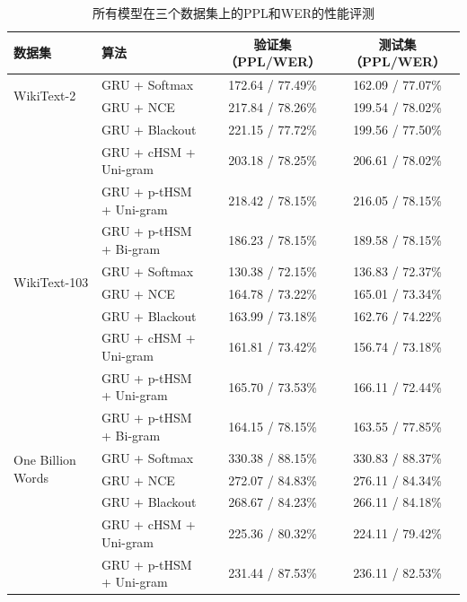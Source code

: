 \begin{table}[!t]
  \centering
  \caption{所有模型在三个数据集上的PPL和WER的性能评测\label{tab:summary_ppl}}
\begin{tabular}{llcc}
  \toprule
数据集& 算法& 验证集（PPL/WER） & 测试集（PPL/WER） \\ \midrule
 \multirow{2}{*}{WikiText-2}&GRU + Softmax&172.64 / 77.49\%&162.09 / 77.07\% \\
  &GRU + NCE~\cite{DBLP:journals/jmlr/GutmannH10}&217.84 / 78.26\%&199.54 / 78.02\%\\
  &GRU + Blackout~\cite{DBLP:journals/iclr/JiVSAD15}&221.15 / 77.72\%&199.56 / 77.50\% \\
  &GRU + cHSM + Uni-gram~\cite{DBLP:conf/acl/ChenGA16}&203.18 / 78.25\%&206.61 / 78.02\%\\
  &GRU + p-tHSM + Uni-gram~\cite{DBLP:conf/nips/MikolovSCCD13}&218.42 / 78.15\%&216.05 / 78.15\%\\
  &GRU + p-tHSM + Bi-gram~\cite{DBLP:journals/coling/BrownPdLM92}&186.23 / 78.15\%&189.58 / 78.15\%\\\midrule
   \multirow{2}{*}{WikiText-103} &GRU + Softmax&130.38 / 72.15\%&136.83 / 72.37\%\\
 &GRU + NCE~\cite{DBLP:journals/jmlr/GutmannH10}&164.78 / 73.22\%&165.01 / 73.34\%\\
  &GRU + Blackout~\cite{DBLP:journals/iclr/JiVSAD15}&163.99 / 73.18\%&162.76 / 74.22\%\\
  &GRU + cHSM + Uni-gram~\cite{DBLP:conf/acl/ChenGA16}&161.81 / 73.42\%&156.74 / 73.18\%\\
  &GRU + p-tHSM + Uni-gram~\cite{DBLP:conf/nips/MikolovSCCD13}&165.70 / 73.53\%&166.11 / 72.44\%\\
  &GRU + p-tHSM + Bi-gram~\cite{DBLP:journals/coling/BrownPdLM92}&164.15 / 78.15\%&163.55 / 77.85\%\\\midrule
  \multirow{2}{*}{One Billion Words} &GRU + Softmax&330.38 / 88.15\%&330.83 / 88.37\%\\
 & GRU + NCE~\cite{DBLP:journals/jmlr/GutmannH10}&272.07 / 84.83\%&276.11 / 84.34\%\\
  &GRU + Blackout~\cite{DBLP:journals/iclr/JiVSAD15}&268.67 / 84.23\%&266.11 / 84.18\%\\
 & GRU + cHSM + Uni-gram~\cite{DBLP:conf/acl/ChenGA16}&225.36 / 80.32\%&224.11 / 79.42\%\\
 & GRU + p-tHSM + Uni-gram~\cite{DBLP:conf/nips/MikolovSCCD13}&231.44 / 87.53\%&236.11 / 82.53\%\\
  \bottomrule
\end{tabular}
\end{table}

